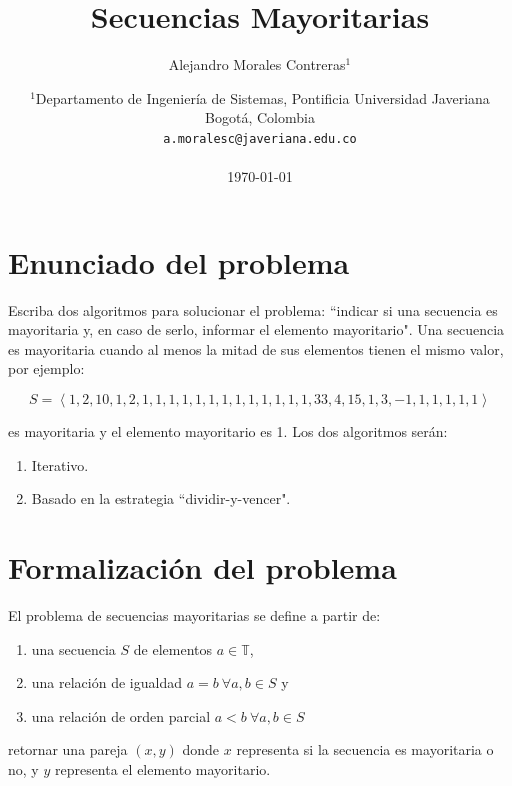 \documentclass[letter]{article}
\title{Secuencias Mayoritarias}
\author{Alejandro Morales Contreras$^1$}
\date{
	$^1$Departamento de Ingeniería de Sistemas, Pontificia Universidad Javeriana\\Bogotá,  Colombia \\
	\texttt{a.moralesc@javeriana.edu.co}\\~\\
	\today
}
\begin{document}
\maketitle

\tableofcontents

\section{Enunciado del problema} \label{enunciado}

Escriba dos algoritmos para solucionar el problema: ``indicar si una secuencia es mayoritaria y, en caso de serlo, informar el elemento mayoritario". Una secuencia es mayoritaria cuando al menos la mitad de sus elementos tienen el mismo valor, por ejemplo: \par

\[ S = \left< 1, 2, 10, 1, 2, 1, 1, 1, 1, 1, 1, 1, 1, 1, 1, 1, 1, 1, 33, 4, 15, 1, 3, -1, 1, 1, 1, 1, 1 \right> \]

es mayoritaria y el elemento mayoritario es 1. Los dos algoritmos serán: \par

\begin{enumerate}
    \item Iterativo.
    \item Basado en la estrategia ``dividir-y-vencer".
\end{enumerate}

\section{Formalización del problema} \label{formalizacion}

El problema de secuencias mayoritarias se define a partir de:
  \begin{enumerate}
    \item una secuencia $S$ de elementos $a\in \mathbb{T}$,
    \item una relación de igualdad $a=b ~\forall a,b \in S$ y
    \item una relación de orden parcial $a<b ~\forall a,b \in S$
  \end{enumerate}
retornar una pareja $(x, y)$ donde $x$ representa si la secuencia es mayoritaria o no, y $y$ representa el elemento mayoritario. \par
\end{document}
